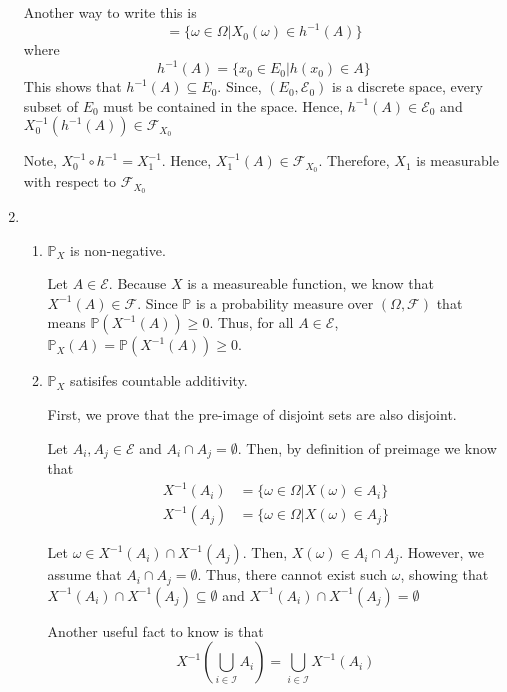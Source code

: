 \documentclass[12pt]{article}
\begin{document}
\begin{enumerate}[start=1,label={\bfseries Problem \arabic*:},leftmargin=1in]
    Another way to write this is 
    \[
        = \{ \omega \in \Omega | X_{0}(\omega) \in h^{-1}(A) \}
    \]
    where 
    \[
        h^{-1}(A) = \{ x_{0} \in E_{0} | h(x_{0}) \in A\}
    \]
    This shows that $h^{-1}(A) \subseteq E_{0}$. Since, $(E_{0}, \mathcal{E}_{0})$ is a discrete space, 
    every subset of $E_{0}$ must be contained in the space. Hence, $h^{-1}(A) \in \mathcal{E}_{0}$
    and $X_{0}^{-1}(h^{-1}(A)) \in \mathcal{F}_{X_{0}}$

    Note, $X_{0}^{-1} \circ h^{-1} = X_{1}^{-1}$. Hence, $X_{1}^{-1}(A) \in \mathcal{F}_{X_{0}}$. Therefore, $X_{1}$ is measurable with respect to $\mathcal{F}_{X_{0}}$

    \item \begin{enumerate}
        \item $\mathbb{P}_{X}$ is non-negative.
        
            Let $A \in \mathcal{E}$. Because $X$ is a measureable function, we know that $X^{-1}(A) \in \mathcal{F}$. 
            Since $\mathbb{P}$ is a probability measure over $(\Omega, \mathcal{F})$ that means $\mathbb{P}(X^{-1}(A)) \geq 0$. Thus,
            for all $A \in \mathcal{E}$, $\mathbb{P}_{X}(A) = \mathbb{P}(X^{-1}(A)) \geq 0$.
        \item $\mathbb{P}_{X}$ satisifes countable additivity. 
        
        First, we prove that the pre-image of disjoint sets are also disjoint. 

        Let $A_{i}, A_{j} \in \mathcal{E}$ and $A_{i} \cap A_{j} = \emptyset$. Then,
        by definition of preimage we know that 
        \begin{align*}
            X^{-1}(A_i) &= \{ \omega \in \Omega | X(\omega) \in A_{i}\}\\
            X^{-1}(A_j) &= \{ \omega \in \Omega | X(\omega) \in A_{j}\}
        \end{align*}
        
        Let $\omega \in X^{-1}(A_i) \cap X^{-1}(A_j)$. Then, $X(\omega) \in A_{i} \cap A_{j}$. 
        However, we assume that $A_{i} \cap A_{j} = \emptyset$. Thus, there cannot exist such $\omega$, showing that $X^{-1}(A_i) \cap X^{-1}(A_j) \subseteq \emptyset$ and $X^{-1}(A_i) \cap X^{-1}(A_j) = \emptyset$
        
        Another useful fact to know is that 
        \[
            X^{-1}(\bigcup_{i \in \mathcal{I}}A_{i}) = \bigcup_{i \in \mathcal{I}} X^{-1}(A_{i})
        \]
        

\end{enumerate}
\end{enumerate}
\end{document}
